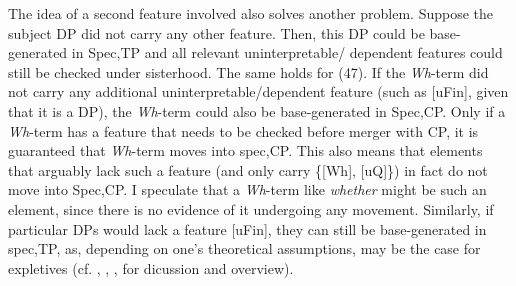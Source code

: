 \documentclass[output=paper
,modfonts
,nonflat]{langsci/langscibook}
\begin{document}
\begin{figure}[!h]
	\begin{exe}
	\end{exe}
\end{figure}
\newpage \noindent
The idea of a second feature involved also solves another problem. Suppose the subject DP did not carry any other feature. Then, this DP could be base-generated in Spec,TP and all relevant uninterpretable/ dependent features could still be checked under sisterhood. The same holds for (47). If the \textit{Wh}-term did not carry any additional uninterpretable/dependent feature (such as [uFin], given that it is a DP), the \textit{Wh}-term could also be base-generated in Spec,CP. Only if a \textit{Wh}-term has a feature that needs to be checked before merger with CP, it is guaranteed that \textit{Wh}-term moves into spec,CP. This also means that elements that arguably lack such a feature (and only carry \{[Wh], [uQ]\}) in fact do not move into Spec,CP. I speculate that a \textit{Wh}{}-term like \textit{whether} might be such an element, since there is no evidence of it undergoing any movement. Similarly, if particular DPs would lack a feature [uFin], they can still be base-generated in spec,TP, as, depending on one’s theoretical assumptions, may be the case for expletives (cf. \citealt{Chomsky2000}, \citealt{Bošković2002}, \citealt{Deal2009}, \citealt{Wu2018} for dicussion and overview). 
\end{document}
